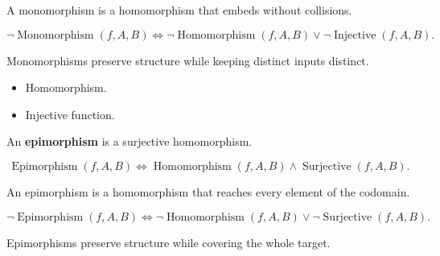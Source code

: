 \begin{remark*}
A monomorphism is a homomorphism that embeds without collisions.
\end{remark*}

\begin{remark*}
\[
\neg\operatorname{Monomorphism}(f,A,B)
\Longleftrightarrow
\neg\operatorname{Homomorphism}(f,A,B)
\lor
\neg\operatorname{Injective}(f,A,B).
\]
\end{remark*}

\begin{remark*}[Interpretation]
Monomorphisms preserve structure while keeping distinct inputs distinct.
\end{remark*}

\begin{remark*}[Dependencies]
\begin{itemize}
  \item Homomorphism.
  \item Injective function.
\end{itemize}
\end{remark*}

\begin{definition}[Epimorphism]
\label{def:epimorphism}
An \textbf{epimorphism} is a surjective homomorphism.
\end{definition}

\begin{remark*}
\[
\operatorname{Epimorphism}(f,A,B)
\Longleftrightarrow
\operatorname{Homomorphism}(f,A,B)
\land
\operatorname{Surjective}(f,A,B).
\]
\end{remark*}

\begin{remark*}
An epimorphism is a homomorphism that reaches every element of the codomain.
\end{remark*}

\begin{remark*}
\[
\neg\operatorname{Epimorphism}(f,A,B)
\Longleftrightarrow
\neg\operatorname{Homomorphism}(f,A,B)
\lor
\neg\operatorname{Surjective}(f,A,B).
\]
\end{remark*}

\begin{remark*}[Interpretation]
Epimorphisms preserve structure while covering the whole target.
\end{remark*}

